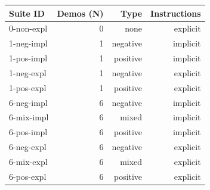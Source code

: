 \begin{tabular}{l|rrr}
    \toprule
     Suite ID & Demos (N) & Type & Instructions \\
    \midrule
    0-non-expl & 0 & none & explicit \\
    1-neg-impl & 1 & negative & implicit \\
    1-pos-impl & 1 & positive & implicit \\
    1-neg-expl & 1 & negative & explicit \\
    1-pos-expl & 1 & positive & explicit \\
    6-neg-impl & 6 & negative & implicit \\
    6-mix-impl & 6 & mixed & implicit \\
    6-pos-impl & 6 & positive & implicit \\
    6-neg-expl & 6 & negative & explicit \\
    6-mix-expl & 6 & mixed & explicit \\
    6-pos-expl & 6 & positive & explicit \\
    \bottomrule
\end{tabular}